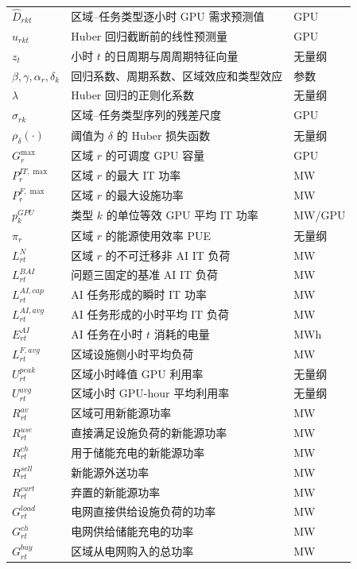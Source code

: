\documentclass[withoutpreface,bwprint]{cumcmthesis}
\begin{document}
{\begin{longtable}{lll}
$\widehat D_{rkt}$ & 区域--任务类型逐小时 GPU 需求预测值 & GPU \\
$u_{rkt}$ & Huber 回归截断前的线性预测量 & GPU \\
$z_t$ & 小时 $t$ 的日周期与周周期特征向量 & 无量纲 \\
$\beta,\gamma,\alpha_r,\delta_k$ & 回归系数、周期系数、区域效应和类型效应 & 参数 \\
$\lambda$ & Huber 回归的正则化系数 & 无量纲 \\
$\sigma_{rk}$ & 区域--任务类型序列的残差尺度 & GPU \\
$\rho_{\delta}(\cdot)$ & 阈值为 $\delta$ 的 Huber 损失函数 & 无量纲 \\
$G_r^{\max}$ & 区域 $r$ 的可调度 GPU 容量 & GPU \\
$P_r^{IT,\max}$ & 区域 $r$ 的最大 IT 功率 & MW \\
$P_r^{F,\max}$ & 区域 $r$ 的最大设施功率 & MW \\
$p_k^{GPU}$ & 类型 $k$ 的单位等效 GPU 平均 IT 功率 & MW/GPU \\
$\pi_r$ & 区域 $r$ 的能源使用效率 PUE & 无量纲 \\
$L_{rt}^{N}$ & 区域 $r$ 的不可迁移非 AI IT 负荷 & MW \\
$L_{rt}^{BAI}$ & 问题三固定的基准 AI IT 负荷 & MW \\
$L_{rt}^{AI,cap}$ & AI 任务形成的瞬时 IT 功率 & MW \\
$L_{rt}^{AI,avg}$ & AI 任务形成的小时平均 IT 负荷 & MW \\
$E_{rt}^{AI}$ & AI 任务在小时 $t$ 消耗的电量 & MWh \\
$L_{rt}^{F,avg}$ & 区域设施侧小时平均负荷 & MW \\
$U_{rt}^{peak}$ & 区域小时峰值 GPU 利用率 & 无量纲 \\
$U_{rt}^{avg}$ & 区域小时 GPU-hour 平均利用率 & 无量纲 \\
$R_{rt}^{av}$ & 区域可用新能源功率 & MW \\
$R_{rt}^{use}$ & 直接满足设施负荷的新能源功率 & MW \\
$R_{rt}^{ch}$ & 用于储能充电的新能源功率 & MW \\
$R_{rt}^{sell}$ & 新能源外送功率 & MW \\
$R_{rt}^{curt}$ & 弃置的新能源功率 & MW \\
$G_{rt}^{load}$ & 电网直接供给设施负荷的功率 & MW \\
$G_{rt}^{ch}$ & 电网供给储能充电的功率 & MW \\
$G_{rt}^{buy}$ & 区域从电网购入的总功率 & MW \\

\end{longtable}}
\end{document}
